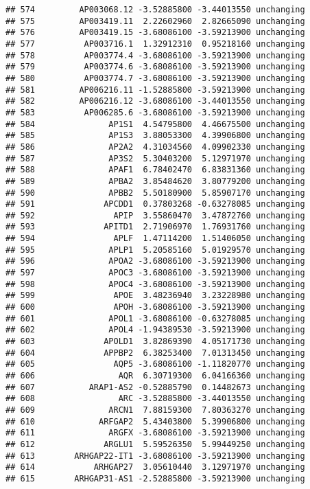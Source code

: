 \documentclass[]{article}
\begin{document}
\begin{verbatim}
## 574         AP003068.12 -3.52885800 -3.44013550 unchanging
## 575         AP003419.11  2.22602960  2.82665090 unchanging
## 576         AP003419.15 -3.68086100 -3.59213900 unchanging
## 577          AP003716.1  1.32912310  0.95218160 unchanging
## 578          AP003774.4 -3.68086100 -3.59213900 unchanging
## 579          AP003774.6 -3.68086100 -3.59213900 unchanging
## 580          AP003774.7 -3.68086100 -3.59213900 unchanging
## 581         AP006216.11 -1.52885800 -3.59213900 unchanging
## 582         AP006216.12 -3.68086100 -3.44013550 unchanging
## 583          AP006285.6 -3.68086100 -3.59213900 unchanging
## 584               AP1S1  4.54795800  4.46675500 unchanging
## 585               AP1S3  3.88053300  4.39906800 unchanging
## 586               AP2A2  4.31034560  4.09902330 unchanging
## 587               AP3S2  5.30403200  5.12971970 unchanging
## 588               APAF1  6.78402470  6.83831360 unchanging
## 589               APBA2  3.85484620  3.80779200 unchanging
## 590               APBB2  5.50180900  5.85907170 unchanging
## 591              APCDD1  0.37803268 -0.63278085 unchanging
## 592                APIP  3.55860470  3.47872760 unchanging
## 593              APITD1  2.71906970  1.76931760 unchanging
## 594                APLF  1.47114200  1.51406050 unchanging
## 595               APLP1  5.20585160  5.01929570 unchanging
## 596               APOA2 -3.68086100 -3.59213900 unchanging
## 597               APOC3 -3.68086100 -3.59213900 unchanging
## 598               APOC4 -3.68086100 -3.59213900 unchanging
## 599                APOE  3.48236940  3.23228980 unchanging
## 600                APOH -3.68086100 -3.59213900 unchanging
## 601               APOL1 -3.68086100 -0.63278085 unchanging
## 602               APOL4 -1.94389530 -3.59213900 unchanging
## 603              APOLD1  3.82869390  4.05171730 unchanging
## 604              APPBP2  6.38253400  7.01313450 unchanging
## 605                AQP5 -3.68086100 -1.11820770 unchanging
## 606                 AQR  6.30719300  6.04166360 unchanging
## 607           ARAP1-AS2 -0.52885790  0.14482673 unchanging
## 608                 ARC -3.52885800 -3.44013550 unchanging
## 609               ARCN1  7.88159300  7.80363270 unchanging
## 610             ARFGAP2  5.43403800  5.39906800 unchanging
## 611               ARGFX -3.68086100 -3.59213900 unchanging
## 612              ARGLU1  5.59526350  5.99449250 unchanging
## 613        ARHGAP22-IT1 -3.68086100 -3.59213900 unchanging
## 614            ARHGAP27  3.05610440  3.12971970 unchanging
## 615        ARHGAP31-AS1 -2.52885800 -3.59213900 unchanging

\end{verbatim}
\end{document}
